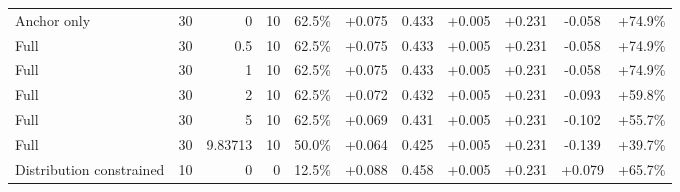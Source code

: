 \begin{table}[htbp]
\begin{tabular}{lrrrccccccc}
Anchor only & 30 & 0 & 10 & 62.5\% & +0.075 & 0.433 & +0.005 & +0.231 & -0.058 & +74.9\% \\
Full & 30 & 0.5 & 10 & 62.5\% & +0.075 & 0.433 & +0.005 & +0.231 & -0.058 & +74.9\% \\
Full & 30 & 1 & 10 & 62.5\% & +0.075 & 0.433 & +0.005 & +0.231 & -0.058 & +74.9\% \\
Full & 30 & 2 & 10 & 62.5\% & +0.072 & 0.432 & +0.005 & +0.231 & -0.093 & +59.8\% \\
Full & 30 & 5 & 10 & 62.5\% & +0.069 & 0.431 & +0.005 & +0.231 & -0.102 & +55.7\% \\
Full & 30 & 9.83713 & 10 & 50.0\% & +0.064 & 0.425 & +0.005 & +0.231 & -0.139 & +39.7\% \\
Distribution constrained & 10 & 0 & 0 & 12.5\% & +0.088 & 0.458 & +0.005 & +0.231 & +0.079 & +65.7\% \\
\bottomrule
\end{tabular}
\end{table}